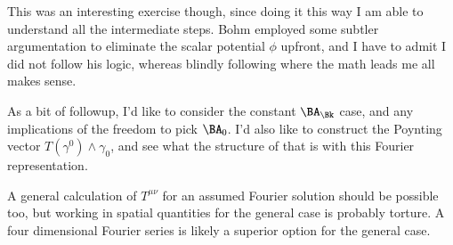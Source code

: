 This was an interesting exercise though, since doing it this way I am able to understand all the intermediate steps.  Bohm employed some subtler argumentation to eliminate the scalar potential $\phi$ upfront, and I have to admit I did not follow his logic, whereas blindly following where the math leads me all makes sense.

As a bit of followup, I'd like to consider the constant $\BA_\Bk$ case, and any implications of the freedom to pick $\BA_0$.  I'd also like to construct the Poynting vector $T(\gamma^0) \wedge \gamma_0$, and see what the structure of that is with this Fourier representation.

A general calculation of $T^{\mu\nu}$ for an assumed Fourier solution should be possible too, but working in spatial quantities for the general case is probably torture.  A four dimensional Fourier series is likely a superior option for the general case.

\EndArticle
